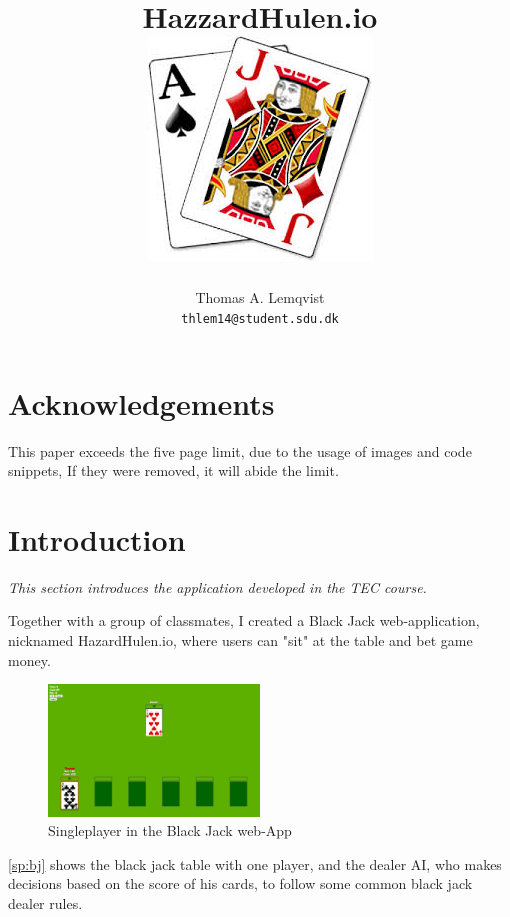 \documentclass[a4paper]{article}
\title{HazzardHulen.io\\[4cm]
\includegraphics[width=.7\textwidth]{../blackjack}
\vfill}
\author{
  Thomas A. Lemqvist\\
  \texttt{thlem14@student.sdu.dk}
}
\begin{document}
\pagestyle{fancy}
\fancyhf{}

\maketitle
\thispagestyle{empty}
\newpage
\hspace{0cm}
\vfill
\tableofcontents

\vfill

\section*{Acknowledgements}
This paper exceeds the five page limit, due to the usage of images and code snippets, If they were removed, it will abide the limit.

\vfill
\newpage

\setcounter{page}{1}




\section{Introduction}
\textit{This section introduces the application developed in the TEC course.}

Together with a group of classmates, I created a Black Jack web-application, nicknamed HazardHulen.io, where users can "sit" at the table and bet game money.

\begin{figure}[H]
  \centering
  \includegraphics[width=0.5\textwidth]{images/singleplayer}	
  \caption{Singleplayer in the Black Jack web-App}
  \label{sp:bj}
\end{figure}

\autoref{sp:bj} shows the black jack table with one player, and the dealer AI, who makes decisions based on the score of his cards, to follow some common black jack dealer rules.
\end{document}
